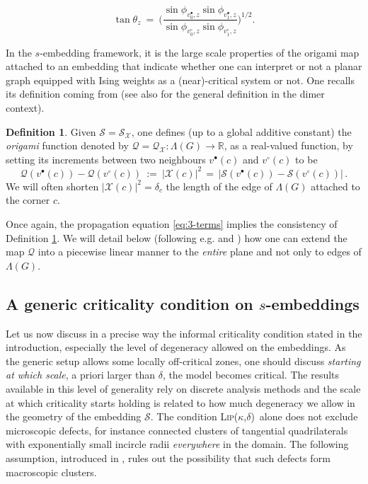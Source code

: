 \documentclass[reqno]{amsart}
\numberwithin{equation}{section}
\theoremstyle{definition}
\newtheorem{definition}[theo]{Definition}
\theoremstyle{remark}
\newcommand\R{\mathbb{R}}
\newcommand\cQ{\mathcal{Q}}
\newcommand\cS{\mathcal{S}}
\newcommand\cX{\mathcal{X}}
\def\LipKd{{\mbox{\textsc{Lip(}$\kappa$\textsc{,}$\delta$\textsc{)}}}}
\begin{document}
\begin{equation}
\label{eq:theta-from-S}
\tan\theta_z\ =\ \biggl(\frac{\sin\phi_{v_0^\bullet ,z}\sin\phi_{v_1^\bullet ,z}}{\sin\phi_{v_0^\circ ,z}\sin\phi_{v_1^\circ ,z}}\biggr)^{\!1/2}.
\end{equation}

In the $s$-embedding framework, it is the large scale properties of the origami map attached to an embedding that indicate whether one can interpret or not a planar graph equipped with Ising weights as a (near)-critical system or not. One recalls its definition coming from \cite[Definition 2.2]{Che20} (see also \cite{KLRR,CLR1} for the general definition in the dimer context).

\begin{definition}\label{def:cQ-def}
Given $\cS=\cS_\cX$, one defines (up to a global additive constant) the \emph{origami} function denoted by \mbox{$\cQ=\cQ_\cX:\Lambda(G)\to\R$}, as a real-valued function, by setting its increments between two neighbours $v^{\bullet}(c) $ and $v^\circ (c) $ to be
\begin{equation}
\label{eq:cQ-def}
\cQ(v^\bullet(c))-\cQ(v^\circ(c))\ :=\ |\cX(c)|^2\,=\,|\cS(v^\bullet(c))-\cS(v^\circ(c))|\,.
\end{equation}
We will often shorten $|\cX(c)|^2=\delta_c$ the length of the edge of $\Lambda(G)$ attached to the corner $c$.
\end{definition}

Once again, the propagation equation \eqref{eq:3-terms} implies the consistency of Definition \ref{def:cQ-def}. We will detail below (following e.g.  \cite[Section 2.3]{Che20} and \cite[Section 7]{KLRR}) how one can extend the map $\cQ$ into a piecewise linear manner to the \emph{entire} plane and not only to edges of $\Lambda(G)$.

\subsection{A generic criticality condition on $s$-embeddings}\label{sub:criticality-condition}
Let us now discuss in a precise way the informal criticality condition stated in the introduction, especially the level of degeneracy allowed on the embeddings. As the generic setup allows some locally off-critical zones, one should discuss \emph{starting at which scale}, a priori larger than $\delta$, the model becomes critical. The results available in this level of generality rely on discrete analysis methods and the scale at which criticality starts holding is related to how much degeneracy we allow in the geometry of the embedding $\cS$. The condition \LipKd\ alone does not exclude microscopic defects, for instance connected clusters of tangential quadrilaterals with exponentially small incircle radii \emph{everywhere} in the domain. The following assumption, introduced in \cite[Assumption~1.2]{CLR1}, rules out the possibility that such defects form macroscopic clusters.
\end{document}
